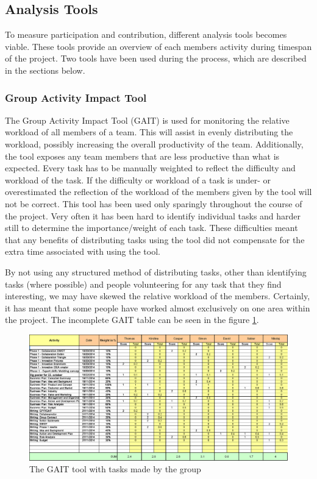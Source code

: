 \subsection{Analysis Tools}
To measure participation and contribution, different analysis tools becomes viable. These tools provide an overview of each members activity during timespan of the project. Two tools have been used during the process, which are described in the sections below.

\subsubsection{Group Activity Impact Tool}
 The Group Activity Impact Tool (GAIT) is used for monitoring the relative workload of all members of a team. This will assist in evenly distributing the workload, possibly increasing the overall productivity of the team. Additionally, the tool exposes any team members that are less productive than what is expected. Every task has to be manually weighted to reflect the difficulty and workload of the task. If the difficulty or workload of a task is under- or overestimated the reflection of the workload of the members given by the tool will not be correct.
This tool has been used only sparingly throughout the course of the project. Very often it has been hard to identify individual tasks and harder still to determine the importance/weight of each task. These difficulties meant that any benefits of distributing tasks using the tool did not compensate for the extra time associated with using the tool. 

By not using any structured method of distributing tasks, other than identifying tasks (where possible) and people volunteering for any task that they find interesting, we may have skewed the relative workload of the members. Certainly, it has meant that some people have worked almost exclusively on one area within the project. The incomplete GAIT table can be seen in the figure \ref{fig:GAIT}.

\begin{figure}[h!]
	\includegraphics[width=\textwidth]{./graphics/gait}
	\caption{The GAIT tool with tasks made by the group}
	\label{fig:GAIT}
\end{figure}


